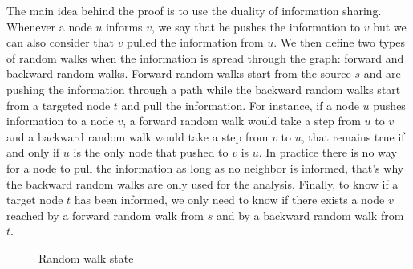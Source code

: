 \documentclass[10pt,journal,a4paper]{IEEEtran}
\begin{document}
The main idea behind the proof is to use the duality of information sharing. Whenever a node $u$ informs $v$, we say that he pushes the information to $v$ but we can also consider that $v$ pulled the information from $u$. We then define two types of random walks when the information is spread through the graph: forward and backward random walks. Forward random walks start from the source $s$ and are pushing the information through a path while the backward random walks start from a targeted node $t$ and pull the information. For instance, if a node $u$ pushes information to a node $v$, a forward random walk would take a step from $u$ to $v$ and a backward random walk would take a step from $v$ to $u$, that remains true if and only if $u$ is the only node that pushed to $v$ is $u$. In practice there is no way for a node to pull the information as long as no neighbor is informed, that's why the backward random walks are only used for the analysis. Finally, to know if a target node $t$ has been informed, we only need to know if there exists a node $v$ reached by a forward random walk from $s$ and by a backward random walk from $t$.


\begin{figure}[h]
\centering
{}
\caption{Random walk state}
\label{fig:lazyFSM}
\end{figure}
\end{document}
